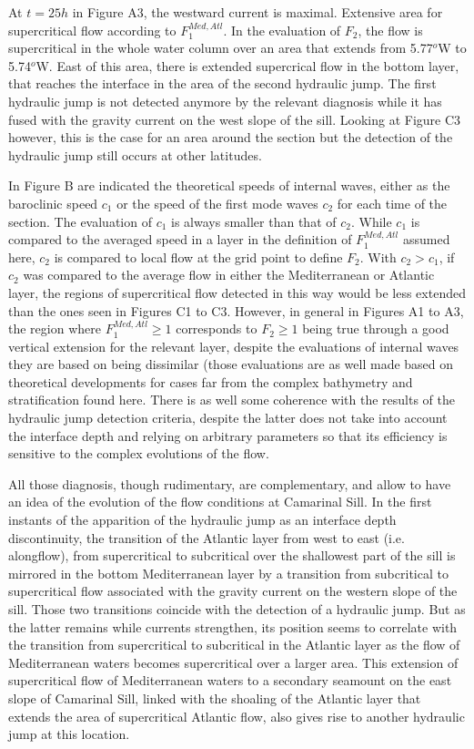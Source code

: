 At $t=25h$ in Figure A3, the westward current is maximal. Extensive area for supercritical flow according to $F_1^{Med,Atl}$. In the evaluation of $F_2$, the flow is supercritical in the whole water column over an area that extends from 5.77$^o$W to 5.74$^o$W. East of this area, there is extended supercrical flow in the bottom layer, that reaches the interface in the area of the second hydraulic jump. The first hydraulic jump is not detected anymore by the relevant diagnosis while it has fused with the gravity current on the west slope of the sill. Looking at Figure C3 however, this is the case for an area around the section but the detection of the hydraulic jump still occurs at other latitudes.

In Figure B are indicated the theoretical speeds of internal waves, either as the baroclinic speed $c_1$ or the speed of the first mode waves $c_2$ for each time of the section. The evaluation of $c_1$ is always smaller than that of $c_2$. While $c_1$ is compared to the averaged speed in a layer in the definition of $F_1^{Med,Atl}$ assumed here, $c_2$ is compared to local flow at the grid point to define $F_2$. With $c_2>c_1$, if $c_2$ was compared to the average flow in either the Mediterranean or Atlantic layer, the regions of supercritical flow detected in this way would be less extended than the ones seen in Figures C1 to C3.%
However, in general in Figures A1 to A3, the region where $F_1^{Med,Atl} \geq 1$ corresponds to $F_2 \geq 1$ being true through a good vertical extension for the relevant layer, despite the evaluations of internal waves they are based on being dissimilar (those evaluations are as well made based on theoretical developments for cases far from the complex bathymetry and stratification found here. There is as well some coherence with the results of the hydraulic jump detection criteria, despite the latter does not take into account the interface depth and relying on arbitrary parameters so that its efficiency is sensitive to the complex evolutions of the flow.

All those diagnosis, though rudimentary, are complementary, and allow to have an idea of the evolution of the flow conditions at Camarinal Sill. In the first instants of the apparition of the hydraulic jump as an interface depth discontinuity, the transition of the Atlantic layer from west to east (i.e. alongflow), from supercritical to subcritical  over the shallowest part of the sill is mirrored in the bottom Mediterranean layer by a transition from subcritical to supercritical flow associated with the gravity current on the western slope of the sill. Those two transitions coincide with the detection of a hydraulic jump. But as the latter remains while currents strengthen, its position seems to correlate with the transition from supercritical to subcritical in the Atlantic layer as the flow of Mediterranean waters becomes supercritical over a larger area. This extension of supercritical flow of Mediterranean waters to a secondary seamount on the east slope of Camarinal Sill, linked with the shoaling of the Atlantic layer that extends the area of supercritical Atlantic flow, also gives rise to another hydraulic jump at this location.


